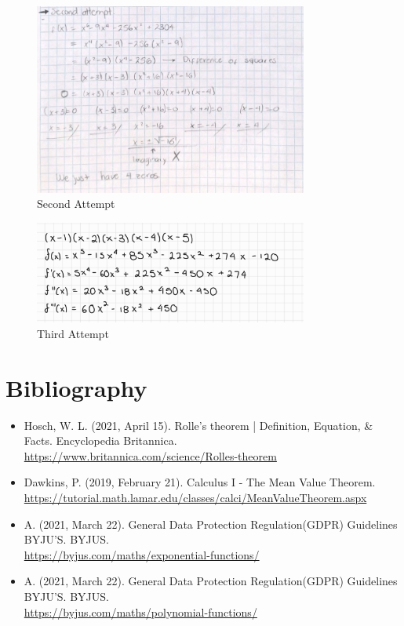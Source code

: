 \documentclass{article}
\begin{document}
    \begin{figure}[H]
        \includegraphics[width=340px]{img/secondattempt.png}
        \caption{Second Attempt}
    \end{figure}

    \begin{figure}[H]
        \includegraphics[width=340px]{img/thirdattempt.png}
        \caption{Third Attempt}
    \end{figure}

    \pagebreak
    \section{Bibliography}
    \begin{itemize}
        \item Hosch, W. L. (2021, April 15). Rolle’s theorem | Definition, Equation, \& Facts. Encyclopedia Britannica. \\
        \href{https://www.britannica.com/science/Rolles-theorem}{https://www.britannica.com/science/Rolles-theorem}

        \item Dawkins, P. (2019, February 21). Calculus I - The Mean Value Theorem. \\
        \href{https://tutorial.math.lamar.edu/classes/calci/MeanValueTheorem.aspx}{https://tutorial.math.lamar.edu/classes/calci/MeanValueTheorem.aspx}

        \item A. (2021, March 22). General Data Protection Regulation(GDPR) Guidelines BYJU’S. BYJUS. \\
        \href{https://byjus.com/maths/exponential-functions/}{https://byjus.com/maths/exponential-functions/}

        \item A. (2021, March 22). General Data Protection Regulation(GDPR) Guidelines BYJU’S. BYJUS.\\
        \href{https://byjus.com/maths/polynomial-functions/}{https://byjus.com/maths/polynomial-functions/}
    \end{itemize}
\end{document}
